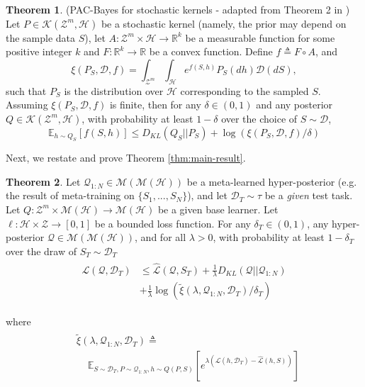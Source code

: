 \documentclass[letterpaper]{article} %
\theoremstyle{definition}
\newtheorem{theorem}{Theorem}[section]
\newcommand{\Expect}[2]{\mathbb{E}_{#1}\left [#2 \right ]}
\begin{document}
\begin{theorem} (PAC-Bayes for stochastic kernels - adapted from Theorem 2 in \citet{Rivasplata2020}) \label{thm:rivasplata-pb-appendix}
	Let $P\in \mathcal{K}(\mathcal{Z}^m, \mathcal{H})$ be a stochastic kernel (namely, the prior may depend on the sample data $S$), let $A: \mathcal{Z}^m\times \mathcal{H}\rightarrow \mathbb{R}^k$ be a measurable function for some positive integer $k$ and $F:\mathbb{R}^k\rightarrow \mathbb{R}$ be a convex function.
	Define $f\triangleq F\circ A$, and  
	$$
	\xi(P_S, \mathcal{D}, f)=\int_{\mathcal{Z}^m}\int_{\mathcal{H}}e^{f(S, h)}P_S(dh)\mathcal{D}(dS) , 
	$$
	such that $P_S$ is the distribution over $\mathcal{H}$ corresponding to the sampled $S$. Assuming $\xi(P_S, \mathcal{D}, f)$ is finite, then for any $\delta \in (0,1)$ and any posterior $Q\in \mathcal{K}(\mathcal{Z}^m, \mathcal{H})$, with probability at least $1-\delta$ over the choice of $S\sim \mathcal{D}$,
	\begin{equation} \label{eq:ribasplata-pb-appendix}
	\Expect{h\sim Q_S}{f(S, h)} \leq D_{KL}(Q_S||P_S)+\log\left (\xi(P_S, \mathcal{D}, f)/\delta\right )
	\end{equation}
\end{theorem}
%
Next, we restate and prove Theorem \ref{thm:main-result}. 
\begin{theorem} 
	Let $\mathcal{Q}_{1:N}\in \mathcal{M}(\mathcal{M}(\mathcal{H}))$ be a meta-learned hyper-posterior (e.g. the result of meta-training on $\{S_1,...,S_N\}$), and let $\mathcal{D}_T\sim \tau$ be a \emph{given} test task. Let $Q: \mathcal{Z}^m\times\mathcal{M}(\mathcal{H})\rightarrow \mathcal{M}(\mathcal{H})$ be a given base learner. Let $\ell: \mathcal{H}\times \mathcal{Z}\rightarrow [0, 1]$ be a bounded loss function.
	For any $\delta_T \in (0,1)$, any hyper-posterior $\mathcal{Q}\in \mathcal{M}(\mathcal{M}(\mathcal{H}))$, and for all $\lambda>0$, with probability at least $1-\delta_T$ over the draw of $S_T\sim \mathcal{D}_T$
%	
	\begin{align}
	\begin{split}
	\mathcal{L}(\mathcal{Q}, \mathcal{D}_T) &\leq \hat{\mathcal{L}}(\mathcal{Q}, S_T) + \frac{1}{\lambda}D_{KL}(\mathcal{Q}||\mathcal{Q}_{1:N})\\
	&+\frac{1}{\lambda}\log\left (\tilde{\xi}(\lambda,\mathcal{Q}_{1:N},\mathcal{D}_T)/\delta_T\right )
	\end{split}
	\end{align}
	
	where 
	\begin{align} \label{eq:tilde_xi}
	\begin{split}
	&\tilde{\xi}(\lambda,\mathcal{Q}_{1:N},\mathcal{D}_T)\triangleq \\
	&\;\;\;\; \Expect{S\sim \mathcal{D}_T, P\sim \mathcal{Q}_{1:N}, h\sim Q(P,S)}{e^{\lambda\left (\mathcal{L}(h, \mathcal{D}_T)-\hat{\mathcal{L}}(h, S)\right )}}
	\end{split}
	\end{align}
\end{theorem}
\end{document}
